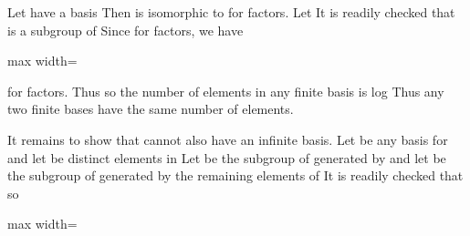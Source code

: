 \documentclass[11pt,oneside]{article}
\begin{document}
\begin{BookBody}

 Let  have a basis  Then  is isomorphic to  for  factors. Let  It is readily checked that  is a subgroup of  Since  for  factors, we have

\begin{center}\begin{adjustbox}{max width=\linewidth}\end{adjustbox}\end{center}

\noindent for  factors. Thus  so the number of elements in any finite basis  is log Thus any two finite bases have the same number of elements.

It remains to show that  cannot also have an infinite basis. Let  be any basis for  and let  be distinct elements in  Let  be the subgroup of  generated by  and let  be the subgroup of  generated by the remaining elements of  It is readily checked that  so

\begin{center}\begin{adjustbox}{max width=\linewidth}\end{adjustbox}\end{center}


\end{BookBody}
\end{document}
